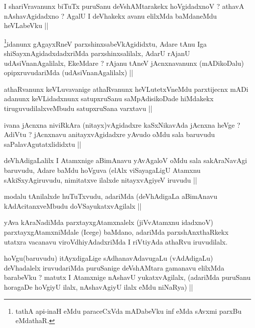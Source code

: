 \begin{artha}
I shariVravanunx biTuTx puruSanu deVshAMtarakekx hoVgidadxnoV ? athavA nAshavAgidadxno ? AgalU I deVhakekx avanu elilxMda baMdaneMdu heVLabeVku ||
\end{artha}

\begin{artha}
\footnote{tathA api-inaH eMdu paraceCxVda mADabeVku inf eMda sAvxmi parxBu eMdathaR.}idanunx gAgayxRneV parxshinxsabeVkAgididxtu, Adare tAnu Iga shiSayxnAgidadxdadxriMda parxshinxsalilalx, AdarU rAjanU udAsiVnanAgalilalx, EkeMdare ? rAjanu tAneV jAcnxnavanunx (mADikoDalu) opipxruvudariMda (udAsiVnanAgalilalx) ||
\end{artha}

\begin{artha}
athaRvanunx keVLuvavanige athaRvanunx heVLutetxVneMdu parxtijecnx mADi adanunx keVLidadxnunx satupxruSanu saMpAdisikoDade hiMdakekx tiruguvudilalxveMbudu satupxruSana varxtavu ||
\end{artha}

\begin{artha}
ivana jAcnxna niviRkAra (nitayx)vAgidadxre kaSxNikavAda jAcnxna heVge ? AdiVtu ? jAcnxnavu anitayxvAgidadxre yAvudo oMdu sala baruvudu saPalavAgutatxlididxtu ||
\end{artha}


\begin{artha}
deVhAdigaLalilx I Atamxnige aBimAnavu yAvAgaloV oMdu sala sakAraNavAgi baruvudu, Adare baMdu hoVguva (elAlx viSayagaLigU Atamxnu sAkiSxyAgiruvudu, nimitatxve ilalxde nitayxvAgiyeV iruvudu ||
\end{artha}


\begin{artha}
modalu tAnilalxde huTuTxvudu, adariMda (deVhAdigaLa aBimAnavu kAdAcitanxveMbudu doVSayukatxvAgilalx ||
\end{artha}

\begin{artha}
yAva kAraNadiMda parxtayxgAtamxnalelx (jiVvAtamxnu idadxnoV) parxtayxgAtamxniMdale (Icege) baMdano, adariMda parxshAnxthaRkekx utatxra vacanavu viroVdhiyAdadxriMda I riVtiyAda athaRvu iruvudilalx.
\end{artha}

\begin{artha}
hoVgu(baruvudu) itAyxdigaLige sAdhanavAdavugaLu (vAdAdigaLu) deVhadalelx iruvudariMda puruSanige deVshAMtara gamanavu elilxMda barabeVku ? matutx I Atamxnige nAshavU yukatxvAgilalx, (adariMda puruSanu horagaDe hoVgiyU ilalx, nAshavAgiyU ilalx eMdu niNaRya) ||
\end{artha}

